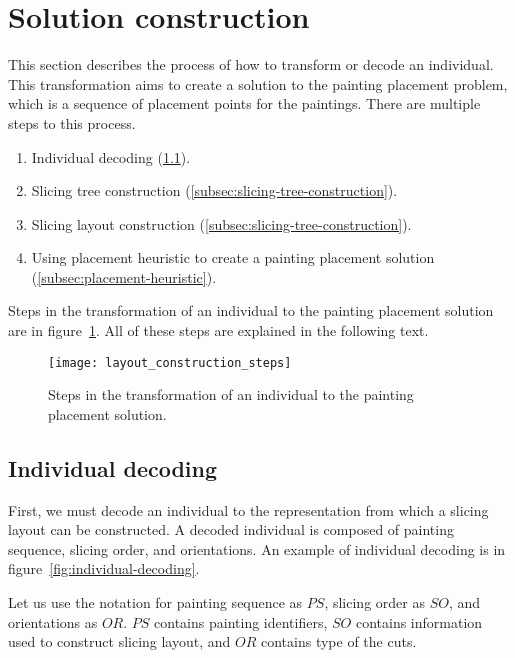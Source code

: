 \newpage


\section{Solution construction}\label{sec:solution-construction}

This section describes the process of how to transform or decode an individual.
This transformation aims to create a solution to the painting placement problem,
which is a sequence of placement points for the paintings.
There are multiple steps to this process.

\begin{enumerate}
    \item Individual decoding (\ref{subsec:individual-decoding}).
    \item Slicing tree construction (\ref{subsec:slicing-tree-construction}).
    \item Slicing layout construction (\ref{subsec:slicing-tree-construction}).
    \item Using placement heuristic to create a painting placement solution (\ref{subsec:placement-heuristic}).
\end{enumerate}

Steps in the transformation of an individual to the painting placement solution are
in figure~\ref{fig:layout-construction-steps}.
All of these steps are explained in the following text.


\begin{figure}[h!]
    \texttt{[image: layout\_construction\_steps]}
    \caption[Transformation of an individual to the painting placement solution]
    {Steps in the transformation of an individual to the painting placement solution.}
    \label{fig:layout-construction-steps}
\end{figure}

\subsection{Individual decoding}\label{subsec:individual-decoding}
First, we must decode an individual to the representation from which a slicing layout can be constructed.
A decoded individual is composed of painting sequence, slicing order, and orientations.
An example of individual decoding is in figure~\ref{fig:individual-decoding}.

Let us use the notation for painting sequence as $PS$, slicing order as $SO$, and orientations as $OR$.
$PS$ contains painting identifiers, $SO$ contains information used to construct slicing layout,
and $OR$ contains type of the cuts.\\

